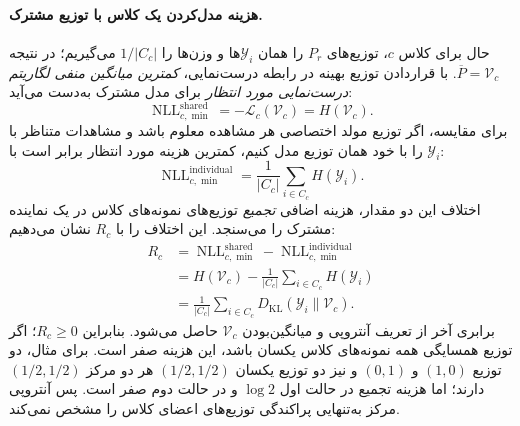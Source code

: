\paragraph{هزینه مدل‌کردن یک کلاس با توزیع مشترک.}
حال برای کلاس $c$، توزیع‌های $P_r$ را همان $\mathscr Y_i$ها و وزن‌ها را $1/|C_c|$ می‌گیریم؛ در نتیجه $\overline P=\mathcal V_c$. با قراردادن توزیع بهینه در رابطه درست‌نمایی، \emph{کمترین میانگین منفی لگاریتم درست‌نمایی مورد انتظار} برای مدل مشترک به‌دست می‌آید:
\begin{equation}\label{eq:ch3-class-shared-NLL}
\boxed{\operatorname{NLL}^{\mathrm{shared}}_{c,\min}
=-\mathcal L_c(\mathcal V_c)=H(\mathcal V_c).}
\end{equation}
برای مقایسه، اگر توزیع مولد اختصاصی هر مشاهده معلوم باشد و مشاهدات متناظر با $\mathscr Y_i$ را با خود همان توزیع مدل کنیم، کمترین هزینه مورد انتظار برابر است با:
\begin{equation}\label{eq:ch3-class-individual-NLL}
\boxed{\operatorname{NLL}^{\mathrm{individual}}_{c,\min}
=\frac{1}{|C_c|}\sum_{i\in C_c}H(\mathscr Y_i).}
\end{equation}
اختلاف این دو مقدار، هزینه اضافی \emph{تجمیع} توزیع‌های نمونه‌های کلاس در یک نماینده مشترک را می‌سنجد. این اختلاف را با $R_c$ نشان می‌دهیم:
\begin{equation}\label{eq:ch3-R-entropy}
\boxed{
\begin{aligned}
R_c
&=\operatorname{NLL}^{\mathrm{shared}}_{c,\min}
-\operatorname{NLL}^{\mathrm{individual}}_{c,\min}\\
&=H(\mathcal V_c)
-\frac1{|C_c|}\sum_{i\in C_c}H(\mathscr Y_i)\\
&=\frac1{|C_c|}\sum_{i\in C_c}
D_{\mathrm{KL}}(\mathscr Y_i\|\mathcal V_c).
\end{aligned}}
\end{equation}
برابری آخر از تعریف آنتروپی و میانگین‌بودن $\mathcal V_c$ حاصل می‌شود. بنابراین $R_c\ge0$؛ اگر توزیع همسایگی همه نمونه‌های کلاس یکسان باشد، این هزینه صفر است. برای مثال، دو توزیع $(1,0)$ و $(0,1)$ و نیز دو توزیع یکسان $(1/2,1/2)$ هر دو مرکز $(1/2,1/2)$ دارند؛ اما هزینه تجمیع در حالت اول $\log2$ و در حالت دوم صفر است. پس آنتروپی مرکز به‌تنهایی پراکندگی توزیع‌های اعضای کلاس را مشخص نمی‌کند.

